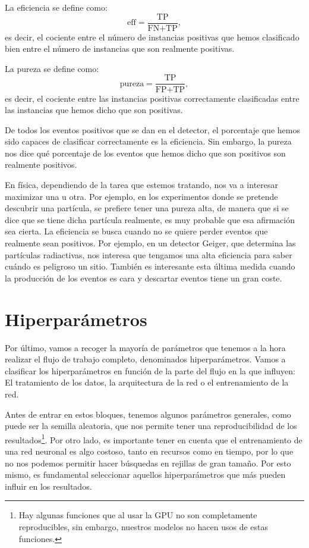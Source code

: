 \documentclass[a4paper,12pt,oneside,titlepage]{book}
\begin{document}
La eficiencia se define como:
\begin{equation}
  \text{eff} = \frac{\text{TP}}{\text{FN} + \text{TP}},
\end{equation}
es decir, el cociente entre el número de instancias positivas que hemos clasificado bien entre el número de instancias que son realmente positivas.

La pureza se define como:
\begin{equation}
  \text{pureza} = \frac{\text{TP}}{\text{FP} + \text{TP}},
\end{equation}
es decir, el cociente entre las instancias positivas correctamente clasificadas entre las instancias que hemos dicho que son positivas. 

De todos los eventos positivos que se dan en el detector, el porcentaje que hemos sido capaces de clasificar correctamente es la eficiencia. Sin embargo, la pureza nos dice qué porcentaje de los eventos que hemos dicho que son positivos son realmente positivos.
 
En física, dependiendo de la tarea que estemos tratando, nos va a interesar maximizar una u otra. Por ejemplo, en los experimentos donde se pretende descubrir una partícula, se prefiere tener una pureza alta, de manera que si se dice que se tiene dicha partícula realmente, es muy probable que esa afirmación sea cierta. La eficiencia se busca cuando no se quiere perder eventos que realmente sean positivos. Por ejemplo, en un detector Geiger, que determina las partículas radiactivas, nos interesa que tengamos una alta eficiencia para saber cuándo es peligroso un sitio. También es interesante esta última medida cuando la producción de los eventos es cara y descartar eventos tiene un gran coste.  

\section{Hiperparámetros}

Por último, vamos a recoger la mayoría de parámetros que tenemos a la hora realizar el flujo de trabajo completo, denominados hiperparámetros. Vamos a clasificar los hiperparámetros en función de la parte del flujo en la que influyen: El tratamiento de los datos, la arquitectura de la red o el entrenamiento de la red.
 
Antes de entrar en estos bloques, tenemos algunos parámetros generales, como puede ser la semilla aleatoria, que nos permite tener una reproducibilidad de los resultados\footnote{Hay algunas funciones que al usar la GPU no son completamente reproducibles, sin embargo, nuestros modelos no hacen usos de estas funciones.}. Por otro lado, es importante tener en cuenta que el entrenamiento de una red neuronal es algo costoso, tanto en recursos como en tiempo, por lo que no nos podemos permitir hacer búsquedas en rejillas de gran tamaño. Por esto mismo, es fundamental seleccionar aquellos hiperparámetros que más pueden influir en los resultados.
\end{document}

